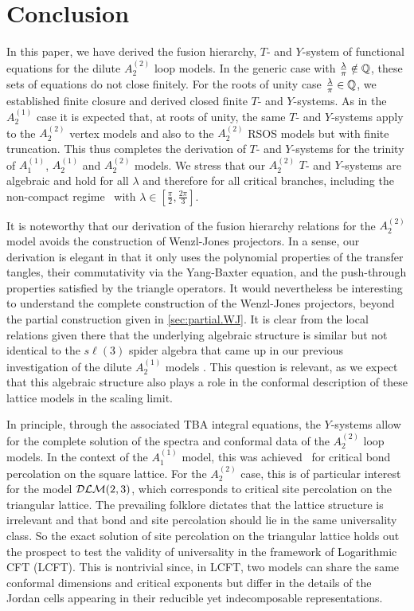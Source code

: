 \documentclass[11pt]{article}
\numberwithin{equation}{section}
\theoremstyle{plain}
\numberwithin{equation}{section}
\begin{document}
\goodbreak
\section{Conclusion}

In this paper, we have derived the fusion hierarchy, $T$- and $Y$-system of functional equations for the dilute $A_2^{(2)}$ loop models. In the generic case with $\frac{\lambda}{\pi}\notin{\Bbb Q}$, these sets of equations do not close finitely. For the roots of unity case $\frac{\lambda}{\pi}\in{\Bbb Q}$, we established finite closure and derived closed finite $T$- and $Y$-systems.
As in the $A_2^{(1)}$ case it is expected that, at roots of unity, the same $T$- and $Y$-systems apply to the $A_2^{(2)}$ vertex models and also to the $A_2^{(2)}$ RSOS models but with finite truncation. This thus completes the derivation of $T$- and $Y$-systems for the trinity of $A_1^{(1)}$, $A_2^{(1)}$ and $A_2^{(2)}$ models. We stress that our $A_2^{(2)}$ $T$- and $Y$-systems are algebraic and hold for all $\lambda$ and therefore for all critical branches, including the non-compact regime~\cite{VJS2014} with $\lambda\in[\frac{\pi}{2},\frac{2\pi}{3}]$.

It is noteworthy that our derivation of the fusion hierarchy relations for the $A_2^{(2)}$ model avoids the construction of Wenzl-Jones projectors. In a sense, our derivation is elegant in that it only uses the polynomial properties of the transfer tangles, their commutativity via the Yang-Baxter equation, and the push-through properties satisfied by the triangle operators. It would nevertheless be interesting to understand the complete construction of the Wenzl-Jones projectors, beyond the partial construction given in \cref{sec:partial.WJ}. It is clear from the local relations given there that the underlying algebraic structure is similar but not identical to the $s\ell(3)$ spider algebra \cite{Kuperberg96} that came up in our previous investigation of the dilute $A_2^{(1)}$ models \cite{MDPR2018}. This question is relevant, as we expect that this algebraic structure also plays a role in the conformal description of these lattice models in the scaling limit.

In principle, through the associated TBA integral equations, the $Y$-systems allow for the complete solution of the spectra and conformal data of the $A_2^{(2)}$ loop models. In the context of the $A_1^{(1)}$ model, this was achieved~\cite{MDKP2017} for critical bond percolation on the square lattice. For the $A_2^{(2)}$ case, this is of particular interest for the model ${\cal DLM}(2,3)$, which corresponds to critical site percolation on the triangular lattice. The prevailing folklore dictates that the lattice structure is irrelevant and that bond and site percolation should lie in the same universality class. So the exact solution of site percolation on the triangular lattice holds out the prospect to test the validity of universality in the framework of Logarithmic CFT (LCFT). This is nontrivial since, in LCFT, two models can share the same conformal dimensions and critical exponents but differ in the details of the Jordan cells appearing in their reducible yet indecomposable representations. 
\end{document}

